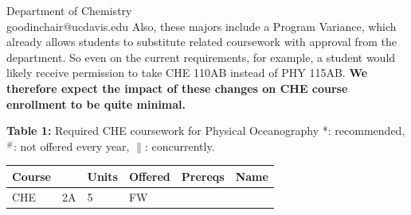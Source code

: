 \documentclass[letterpaper,12pt]{letter}
\begin{document}
\begin{letter}{Department of Chemistry \\ goodinchair@ucdavis.edu}
Also, these majors include a Program Variance, which already allows
students to substitute related coursework with approval from the
department.  So even on the current requirements, for example, a
student would likely receive permission to take CHE 110AB instead of
PHY 115AB.  {\bf We therefore expect the impact of these changes on
  CHE course enrollment to be quite minimal.}

\newpage

{\bf Table 1:}  Required CHE coursework for Physical Oceanography
\vskip 0.25cm
\noindent
*: recommended, $^\#$: not offered every year, $\parallel$: concurrently.\\
\begin{tabular}{|llllll|}
\hline
Course & & Units & Offered & Prereqs & Name \\
\hline
CHE  & 2A     & 5 & FW  & & \\
\hline
\end{tabular}\\


\end{letter}
\end{document}
